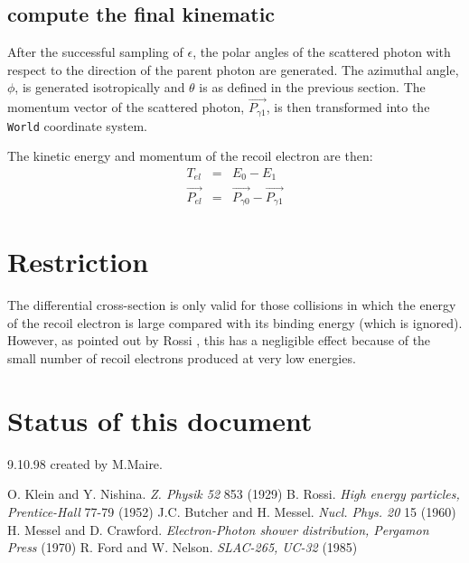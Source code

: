 \subsection{compute the final kinematic}
After the successful sampling of $\epsilon$, the polar angles of the 
scattered photon with respect to the direction of the parent photon
are generated.
The azimuthal angle, $\phi$, is generated isotropically and
$\theta$ is as defined in the previous section. 
The momentum vector of the scattered photon, $\overrightarrow{P_{\gamma1}}$,
is then transformed into the {\tt World} coordinate system.

\noindent The kinetic energy and momentum of the recoil electron are then:
\begin{eqnarray*}
T_{el} & = & E_0 - E_1 \\
\overrightarrow{P_{el}} & = & 
              \overrightarrow{P_{\gamma0}} - \overrightarrow{P_{\gamma1}}
\end{eqnarray*}

\section{Restriction}
 
The differential cross-section is only valid for those
collisions in which the energy of the recoil electron is large compared
with its binding energy (which is ignored). However, as pointed out by
Rossi \cite{rossi}, this has a negligible effect 
because of the small number of
recoil electrons produced at very low energies.
\section{Status of this document}
 9.10.98  created by M.Maire.
  
\begin{thebibliography}{99}
 O. Klein and Y. Nishina.
   {\em Z. Physik 52} 853 (1929)
 B. Rossi.
   {\em High energy particles, Prentice-Hall} 77-79 (1952)       
 J.C. Butcher and H. Messel.
   {\em Nucl. Phys. 20} 15 (1960)   
 H. Messel and D. Crawford.
   {\em Electron-Photon shower distribution, Pergamon Press} (1970)
 R. Ford and W. Nelson.
   {\em SLAC-265, UC-32} (1985)    
\end{thebibliography}

